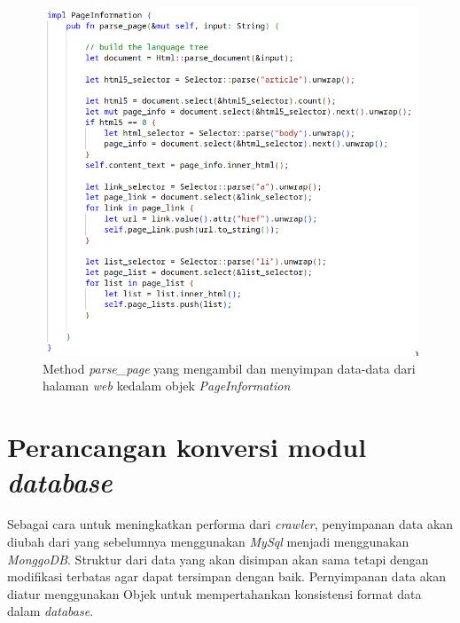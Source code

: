 \begin{figure}[H]
	\centering
	\includegraphics[keepaspectratio, width=15cm]{gambar/parse-method-rs.png}
  \caption{Method \emph{parse\_page} yang mengambil dan menyimpan data-data dari halaman \emph{web} kedalam objek \emph{PageInformation}}
	\label{gambar:parse_method}
\end{figure}

\vspace{0.5cm}

\section{Perancangan konversi modul \emph{database}}

Sebagai cara untuk meningkatkan performa dari \emph{crawler}, penyimpanan data akan diubah dari yang sebelumnya menggunakan \emph{MySql} menjadi menggunakan \emph{MonggoDB}. Struktur dari data yang akan disimpan akan sama tetapi dengan modifikasi terbatas agar dapat tersimpan dengan baik. Pernyimpanan data akan diatur menggunakan Objek untuk mempertahankan konsistensi format data dalam \emph{database}.

